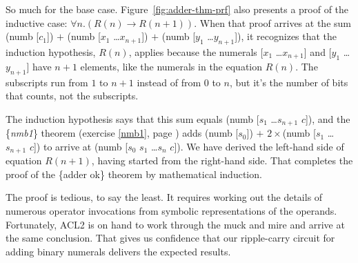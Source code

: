 So much for the base case.
Figure~\ref{fig:adder-thm-prf} also presents
a proof of the inductive case: $\forall n.(R(n) \rightarrow R(n+1))$.
When that proof arrives at the sum
\textsf{(numb [$c_1$])} $+$ \textsf{(numb [$x_1$ \dots $x_{n+1}$])} $+$ \textsf{(numb [$y_1$ \dots $y_{n+1}$])},
it recognizes that the induction hypothesis, $R(n)$, applies because
the numerals \textsf{[$x_1$ \dots $x_{n+1}$]} and \textsf{[$y_1$ \dots $y_{n+1}$]} have $n+1$
elements, like the numerals in the equation $R(n)$.
The subscripts run from $1$ to $n+1$ instead of from $0$ to $n$,
but it's the number of bits that counts, not the subscripts.

The induction hypothesis says that this sum equals
\textsf{(numb [$s_1$ \dots $s_{n+1}$ $c$])}, and
the \{\emph{nmb1}\} theorem (exercise \ref{nmb1}, page \pageref{nmb1})
adds \textsf{(numb [$s_0$])} $+$ $2\times$\textsf{(numb [$s_1$ \dots $s_{n+1}$ $c$])}
to arrive at \textsf{(numb [$s_0$ $s_1$ \dots $s_{n}$ $c$])}.
We have derived the left-hand side
of equation $R(n+1)$, having started from the right-hand side.
That completes the proof of the \{adder ok\} theorem
by mathematical induction.

The proof is tedious, to say the least.
It requires working out the details of
numerous operator invocations
from symbolic representations of the operands.
Fortunately, ACL2 is on hand to work through the
muck and mire and arrive at the same conclusion.
That gives us confidence that our ripple-carry circuit
for adding binary numerals delivers the expected results.

